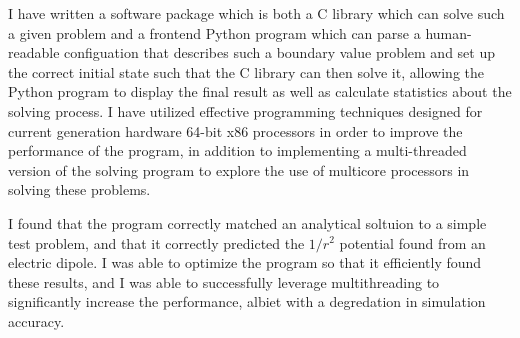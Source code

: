 \documentclass[12pt]{article}
\begin{document}
I have written a software package which is both a C library which can solve such a given problem and a frontend
Python program which can parse a human-readable configuation that describes such a boundary value problem and
set up the correct initial state such that the C library can then solve it, allowing the Python program to
display the final result as well as calculate statistics about the solving process. I have utilized effective
programming techniques designed for current generation hardware 64-bit x86 processors in order to improve
the performance of the program, in addition to implementing a multi-threaded version of the solving program
to explore the use of multicore processors in solving these problems.

I found that the program correctly matched an analytical soltuion to a simple test problem, and that it correctly
predicted the $1/r^2$ potential found from an electric dipole. I was able to optimize the program so that it
efficiently found these results, and I was able to successfully leverage multithreading to significantly increase
the performance, albiet with a degredation in simulation accuracy.

\clearpage
\doublespacing







\end{document}
